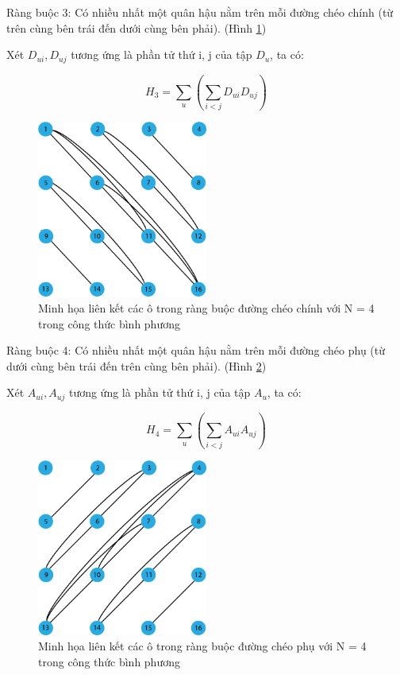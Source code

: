 Ràng buộc 3: Có nhiều nhất một quân hậu nằm trên mỗi đường chéo chính (từ trên cùng bên trái đến dưới cùng bên phải). (Hình \ref{fig:main-diag-square-constraint})

Xét $D_{ui}, D_{uj}$ tương ứng là phần tử thứ i, j của tập $D_u$, ta có:

\[
H_3 = \sum_{u}^{}{( \sum_{i<j}^{}{D_{ui}D_{uj}})}
\]

\begin{figure}[H]
	\centering
	\includegraphics[width=0.5\textwidth]{images/main-diag-square-constraint.png}
	\caption{Minh họa liên kết các ô trong ràng buộc đường chéo chính với N = 4 trong công thức bình phương}
	\label{fig:main-diag-square-constraint}
\end{figure}


Ràng buộc 4: Có nhiều nhất một quân hậu nằm trên mỗi đường chéo phụ (từ dưới cùng bên trái đến trên cùng bên phải). (Hình \ref{fig:anti-diag-square-constraint})

Xét $A_{ui}, A_{uj}$ tương ứng là phần tử thứ i, j của tập $A_u$, ta có:

\[
H_4 = \sum_{u}^{}{( \sum_{i<j}^{}{A_{ui}A_{uj}})}
\]

\begin{figure}[H]
	\centering
	\includegraphics[width=0.5\textwidth]{images/anti_diag_square_constraint.png}
	\caption{Minh họa liên kết các ô trong ràng buộc đường chéo phụ với N = 4 trong công thức bình phương}
	\label{fig:anti-diag-square-constraint}
\end{figure}


